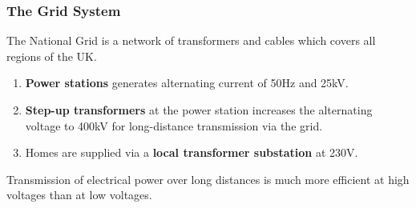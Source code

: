 \subsubsection*{The Grid System}

The National Grid is a network of transformers and cables which covers all regions of the UK.
\begin{enumerate}
    \item \textbf{Power stations} generates alternating current of 50Hz and 25kV.
    \item \textbf{Step-up transformers} at the power station increases the alternating voltage to 400kV for long-distance transmission via the grid.
    \item Homes are supplied via a \textbf{local transformer substation} at 230V.
\end{enumerate}

Transmission of electrical power over long distances is much more efficient at high voltages than at low voltages.
